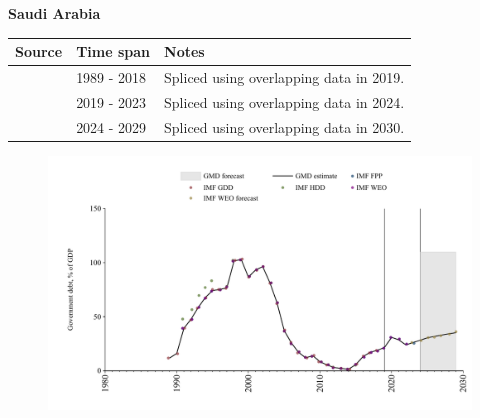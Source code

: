 \documentclass[12pt,a4paper,landscape]{article}
\begin{document}
\begin{adjustbox}{max totalsize={\paperwidth}{\paperheight},center}
\begin{minipage}[t][\textheight][t]{\textwidth}
\vspace*{0.5cm}
{}
\begin{center}
{\Large\bfseries Saudi Arabia}
\end{center}
\vspace{0.5cm}
\begin{table}[H]
\centering
\small
\begin{tabular}{|l|l|l|}
\hline
\textbf{Source} & \textbf{Time span} & \textbf{Notes} \\
\hline
\rowcolor{white}\cite{IMF_GDD}& 1989 - 2018 &Spliced using overlapping data in 2019.\\
\rowcolor{lightgray}\cite{IMF_FPP}& 2019 - 2023 &Spliced using overlapping data in 2024.\\
\rowcolor{white}\cite{IMF_WEO_forecast}& 2024 - 2029 &Spliced using overlapping data in 2030.\\
\hline
\end{tabular}
\end{table}
\begin{figure}[H]
\centering
\includegraphics[width=\textwidth,height=0.6\textheight,keepaspectratio]{graphs/SAU_govdebt_GDP.pdf}
\end{figure}
\end{minipage}
\end{adjustbox}
\end{document}
